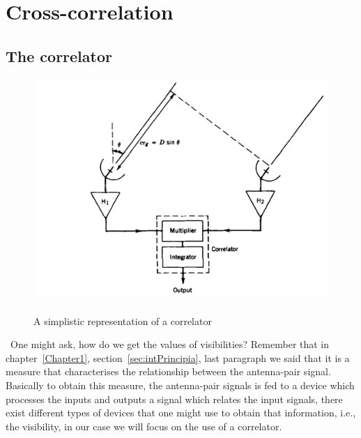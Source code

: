 
\chapter{Cross-correlation} %

\label{Chapter2} %



\section{The correlator}
\label{sec:about2}
\begin{figure}[htbp]
\center
    \includegraphics[scale= 0.15]{Figures/correlatorFil}
 	\caption[A simplistic representation of a correlator]{\\A simplistic representation of a correlator~\citep[Pg.~53,~Fig.~2.3]{thompson2008interferometry}}
	\label{fig:CorrelSet}
\end{figure}
{\citep[From][Sec~2.2]{thompson2008interferometry}}~One might ask, how do we get the values of visibilities? Remember that in chapter~\ref{Chapter1}, section~\ref{sec:intPrincipia}, last paragraph we said that it is a measure that characterises the relationship between the antenna-pair signal. Basically to obtain this measure, the antenna-pair signals is fed to a device which processes the inputs and outputs a signal which relates the input signals, there exist different types of devices that one might use to obtain that information, i.e., the visibility, in our case we will focus on the use of a correlator.\\
